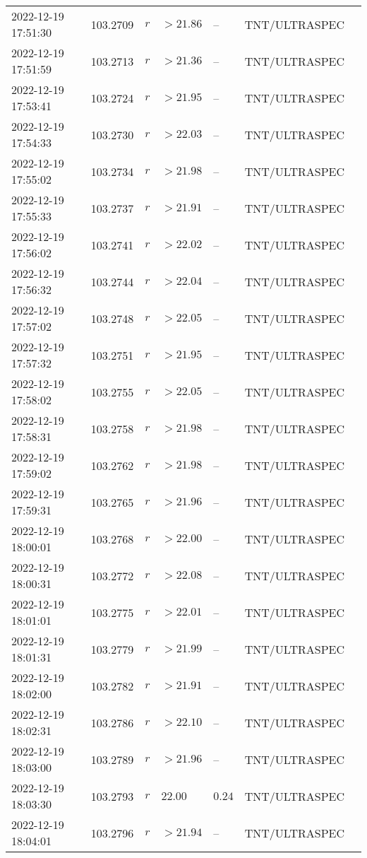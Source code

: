 \documentclass{nature_plusfigure}
\begin{document}
\begin{supplement}
\begin{center}
\begin{longtable}{lllllll}
2022-12-19 17:51:30 & 103.2709 & $r$ & $>21.86$ & -- & TNT/ULTRASPEC &  \\ 
2022-12-19 17:51:59 & 103.2713 & $r$ & $>21.36$ & -- & TNT/ULTRASPEC &  \\ 
2022-12-19 17:53:41 & 103.2724 & $r$ & $>21.95$ & -- & TNT/ULTRASPEC &  \\ 
2022-12-19 17:54:33 & 103.2730 & $r$ & $>22.03$ & -- & TNT/ULTRASPEC &  \\ 
2022-12-19 17:55:02 & 103.2734 & $r$ & $>21.98$ & -- & TNT/ULTRASPEC &  \\ 
2022-12-19 17:55:33 & 103.2737 & $r$ & $>21.91$ & -- & TNT/ULTRASPEC &  \\ 
2022-12-19 17:56:02 & 103.2741 & $r$ & $>22.02$ & -- & TNT/ULTRASPEC &  \\ 
2022-12-19 17:56:32 & 103.2744 & $r$ & $>22.04$ & -- & TNT/ULTRASPEC &  \\ 
2022-12-19 17:57:02 & 103.2748 & $r$ & $>22.05$ & -- & TNT/ULTRASPEC &  \\ 
2022-12-19 17:57:32 & 103.2751 & $r$ & $>21.95$ & -- & TNT/ULTRASPEC &  \\ 
2022-12-19 17:58:02 & 103.2755 & $r$ & $>22.05$ & -- & TNT/ULTRASPEC &  \\ 
2022-12-19 17:58:31 & 103.2758 & $r$ & $>21.98$ & -- & TNT/ULTRASPEC &  \\ 
2022-12-19 17:59:02 & 103.2762 & $r$ & $>21.98$ & -- & TNT/ULTRASPEC &  \\ 
2022-12-19 17:59:31 & 103.2765 & $r$ & $>21.96$ & -- & TNT/ULTRASPEC &  \\ 
2022-12-19 18:00:01 & 103.2768 & $r$ & $>22.00$ & -- & TNT/ULTRASPEC &  \\ 
2022-12-19 18:00:31 & 103.2772 & $r$ & $>22.08$ & -- & TNT/ULTRASPEC &  \\ 
2022-12-19 18:01:01 & 103.2775 & $r$ & $>22.01$ & -- & TNT/ULTRASPEC &  \\ 
2022-12-19 18:01:31 & 103.2779 & $r$ & $>21.99$ & -- & TNT/ULTRASPEC &  \\ 
2022-12-19 18:02:00 & 103.2782 & $r$ & $>21.91$ & -- & TNT/ULTRASPEC &  \\ 
2022-12-19 18:02:31 & 103.2786 & $r$ & $>22.10$ & -- & TNT/ULTRASPEC &  \\ 
2022-12-19 18:03:00 & 103.2789 & $r$ & $>21.96$ & -- & TNT/ULTRASPEC &  \\ 
2022-12-19 18:03:30 & 103.2793 & $r$ & $22.00$ & $0.24$ & TNT/ULTRASPEC &  \\ 
2022-12-19 18:04:01 & 103.2796 & $r$ & $>21.94$ & -- & TNT/ULTRASPEC &  \\ 

\end{longtable}
\end{center}
\end{supplement}
\end{document}
